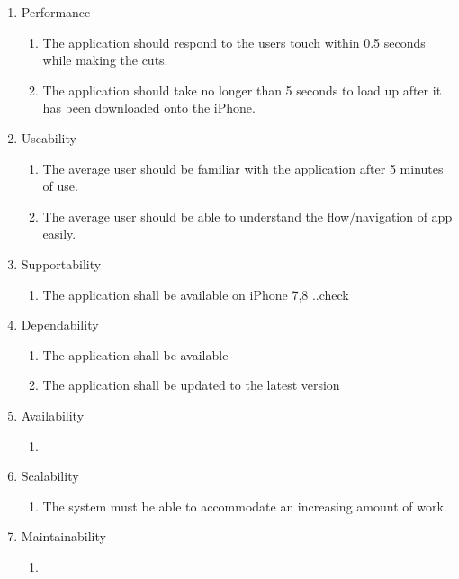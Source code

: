 \documentclass[11pt]{article}
\begin{document}
    \begin{enumerate}
        \item   Performance
            \begin{enumerate}[label*=\arabic*.]
            \item The application should respond to the users touch within 0.5 seconds while making the cuts.
            \item The application should take no longer than 5 seconds to load up after it has been downloaded onto the iPhone.
            \end{enumerate}
            
        \item Useability
            \begin{enumerate}[label*=\arabic*.]
            \item The average user should be familiar with the application after 5 minutes of use. 
            \item The average user should be able to understand the flow/navigation of app easily.
            \end{enumerate}
            
        \item Supportability
            \begin{enumerate}[label*=\arabic*.]
            \item The application shall be available on iPhone 7,8 ..check
            \end{enumerate}
            
        \item Dependability
            \begin{enumerate}[label*=\arabic*.]
            \item The application shall be available
            \item The application shall be updated to the latest version 
            \end{enumerate}
            
        \item Availability
            \begin{enumerate}[label*=\arabic*.]
            \item 
            \end{enumerate}
            
        \item Scalability
            \begin{enumerate}[label*=\arabic*.]
            \item The system must be able to accommodate an increasing amount of work. 
            \end{enumerate} 
            
        \item Maintainability
            \begin{enumerate}[label*=\arabic*.]
            \item %
            \end{enumerate}
         
    \end{enumerate}
\end{document}
